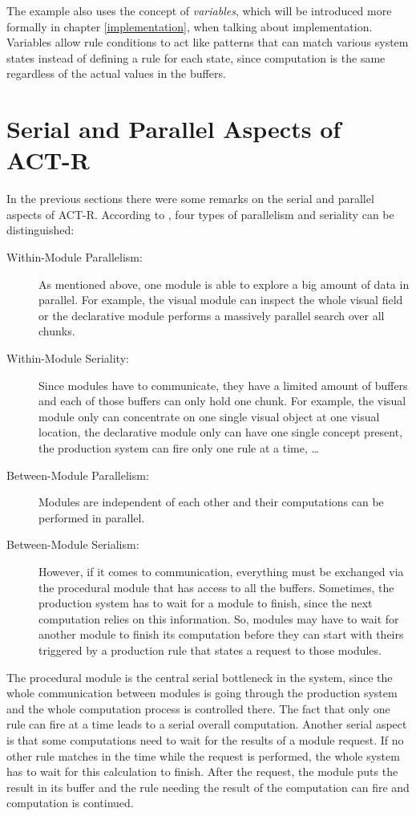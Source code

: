 The example also uses the concept of \emph{variables}, which will be introduced more formally in chapter \ref{implementation}, when talking about implementation. Variables allow rule conditions to act like patterns that can match various system states instead of defining a rule for each state, since computation is the same regardless of the actual values in the buffers.




\section{Serial and Parallel Aspects of ACT-R}
\label{serial_parallel_aspects}

In the previous sections there were some remarks on the serial and parallel aspects of ACT-R. According to \cite[p. 68]{anderson_how_2007}, four types of parallelism and seriality can be distinguished:

\begin{description}
 \item[Within-Module Parallelism:] As mentioned above, one module is able to explore a big amount of data in parallel. For example, the visual module can inspect the whole visual field or the declarative module performs a massively parallel search over all chunks.
 \item[Within-Module Seriality:] Since modules have to communicate, they have a limited amount of buffers and each of those buffers can only hold one chunk. For example, the visual module only can concentrate on one single visual object at one visual location, the declarative module only can have one single concept present, the production system can fire only one rule at a time, \dots 
 \item[Between-Module Parallelism:] Modules are independent of each other and their computations can be performed in parallel.
 \item[Between-Module Serialism:] However, if it comes to communication, everything must be exchanged via the procedural module that has access to all the buffers. Sometimes, the production system has to wait for a module to finish, since the next computation relies on this information. So, modules may have to wait for another module to finish its computation before they can start with theirs triggered by a production rule that states a request to those modules.
\end{description}

The procedural module is the central serial bottleneck in the system, since the whole communication between modules is going through the production system and the whole computation process is controlled there. The fact that only one rule can fire at a time leads to a serial overall computation. Another serial aspect is that some computations need to wait for the results of a module request. If no other rule matches in the time while the request is performed, the whole system has to wait for this calculation to finish. After the request, the module puts the result in its buffer and the rule needing the result of the computation can fire and computation is continued.

